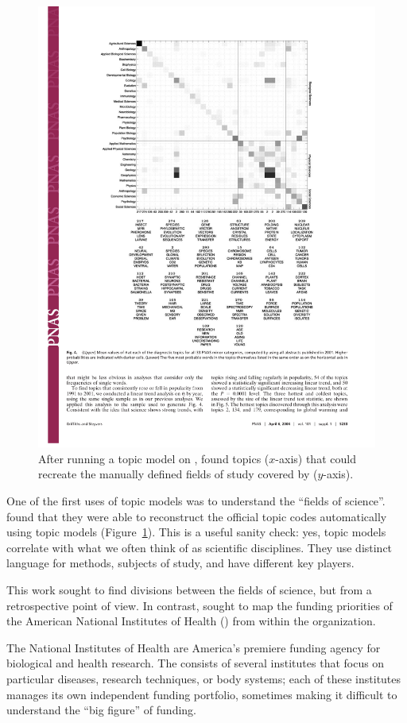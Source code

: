 \begin{figure}
  \includegraphics[width=.8\linewidth]{figures/sci_gs}
  \caption{After running a topic model on ,
    \citet{griffiths-04} found topics ($x$-axis) that could recreate
    the manually defined fields of study covered by 
    ($y$-axis).}
\label{fig:pnas}
\end{figure}

One of the first uses of topic models was to understand the ``fields
of science''.  \citet{griffiths-04} found that they were able to
reconstruct the official  topic codes automatically using
topic models (Figure~\ref{fig:pnas}).  This is a useful sanity check:
yes, topic models correlate with what we often think of as scientific
disciplines.  They use distinct language for methods, subjects of
study, and have different key players.

This work sought to find divisions between the fields of science, but from a retrospective point of view.
In contrast, \citet{talley-11} sought to map the funding priorities of the American National Institutes
of Health () from within the organization.

The National Institutes of Health are America's premiere funding
agency for biological and health research.  The  consists of
several institutes that focus on particular diseases, research techniques, or body
systems; each of these institutes manages its own independent funding portfolio,
sometimes making it difficult to understand the ``big figure'' of funding.

